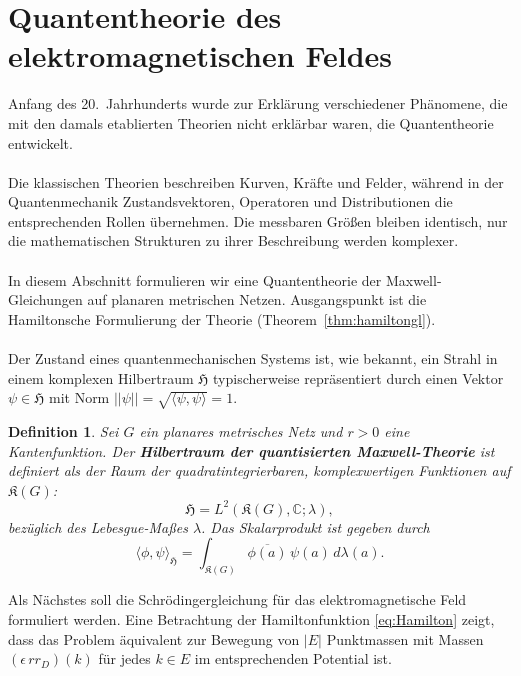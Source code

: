 \documentclass[11pt,a4paper,leqno]{report}
\newtheorem{definition}[theorem]{Definition}
\numberwithin{equation}{chapter}
\begin{document}
\section{Quantentheorie des elektromagnetischen Feldes}
Anfang des 20.~Jahrhunderts wurde zur Erklärung verschiedener Phänomene, die mit den damals etablierten Theorien nicht erklärbar waren, die Quantentheorie entwickelt.\\
\\
Die klassischen Theorien beschreiben Kurven, Kräfte und Felder,
während in der Quantenmechanik Zustandsvektoren, Operatoren und Distributionen die entsprechenden Rollen übernehmen. Die messbaren Größen bleiben identisch, nur die mathematischen Strukturen zu ihrer Beschreibung werden komplexer.\\
\\
In diesem Abschnitt formulieren wir eine Quantentheorie der Maxwell-Gleichungen auf planaren metrischen Netzen. Ausgangspunkt ist die Hamiltonsche Formulierung der Theorie (Theorem~\ref{thm:hamiltongl}).\\
\\
Der Zustand eines quantenmechanischen Systems ist, wie bekannt, ein Strahl in einem komplexen Hilbertraum \(\mathfrak{H}\) typischerweise repräsentiert durch einen Vektor \(\psi\in \mathfrak{H}\) mit Norm \(||\psi|| = \sqrt{\langle \psi, \psi\rangle}=1\).
\begin{definition} \label{def:quanten_hilbertraum}
	Sei \(G\) ein planares metrisches Netz und \(r>0\) eine Kantenfunktion. 
	Der \textbf{Hilbertraum der quantisierten Maxwell-Theorie} ist definiert als 
	der Raum der quadratintegrierbaren, komplexwertigen Funktionen auf \(\mathfrak{K}(G)\):
	\begin{equation}
		\mathfrak{H} = L^2(\mathfrak{K}(G), \mathbb{C}; \lambda),
	\end{equation}
	bezüglich des Lebesgue-Maßes \(\lambda\). Das Skalarprodukt ist gegeben durch
	\begin{equation}
		\langle \phi, \psi \rangle_{\mathfrak{H}} = \int_{\mathfrak{K}(G)} \overline{\phi(a)}\, \psi(a) \, d\lambda(a).
	\end{equation}
\end{definition}
\noindent
Als Nächstes soll die Schrödingergleichung für das elektromagnetische Feld formuliert werden. 
Eine Betrachtung der Hamiltonfunktion \eqref{eq:Hamilton} zeigt, dass das Problem 
äquivalent zur Bewegung von \( |E| \) Punktmassen mit Massen \((\epsilon\,rr_D)(k)\) 
für jedes \( k \in E \) im entsprechenden Potential ist.
\end{document}
